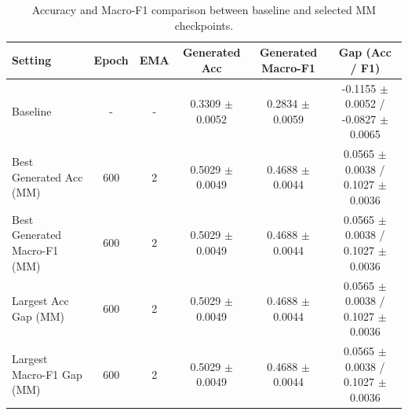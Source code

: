 \begin{table}[t]
\centering
\caption{Accuracy and Macro-F1 comparison between baseline and selected MM checkpoints.}
\begin{tabular}{lccccc}
\toprule
Setting & Epoch & EMA & Generated Acc & Generated Macro-F1 & Gap (Acc / F1) \\
\midrule
Baseline & - & - & 0.3309 $\pm$ 0.0052 & 0.2834 $\pm$ 0.0059 & -0.1155 $\pm$ 0.0052 / -0.0827 $\pm$ 0.0065 \\
Best Generated Acc (MM) & 600 & 2 & 0.5029 $\pm$ 0.0049 & 0.4688 $\pm$ 0.0044 & 0.0565 $\pm$ 0.0038 / 0.1027 $\pm$ 0.0036 \\
Best Generated Macro-F1 (MM) & 600 & 2 & 0.5029 $\pm$ 0.0049 & 0.4688 $\pm$ 0.0044 & 0.0565 $\pm$ 0.0038 / 0.1027 $\pm$ 0.0036 \\
Largest Acc Gap (MM) & 600 & 2 & 0.5029 $\pm$ 0.0049 & 0.4688 $\pm$ 0.0044 & 0.0565 $\pm$ 0.0038 / 0.1027 $\pm$ 0.0036 \\
Largest Macro-F1 Gap (MM) & 600 & 2 & 0.5029 $\pm$ 0.0049 & 0.4688 $\pm$ 0.0044 & 0.0565 $\pm$ 0.0038 / 0.1027 $\pm$ 0.0036 \\
\bottomrule
\end{tabular}
\label{tab:mm_baseline_summary}
\end{table}
